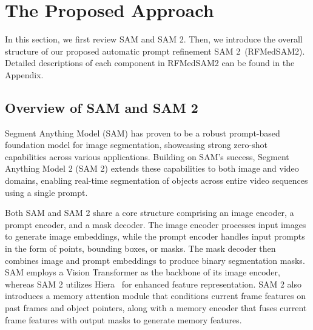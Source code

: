 \section{The Proposed Approach}
\label{sec:method}

In this section, we first review SAM and SAM 2. Then, we introduce the overall structure of our proposed automatic prompt refinement SAM 2~(RFMedSAM2). Detailed descriptions of each component in RFMedSAM2 can be found in the Appendix.






\subsection{Overview of SAM and SAM 2}
Segment Anything Model (SAM) has proven to be a robust prompt-based foundation model for image segmentation, showcasing strong zero-shot capabilities across various applications. Building on SAM's success, Segment Anything Model 2 (SAM 2) extends these capabilities to both image and video domains, enabling real-time segmentation of objects across entire video sequences using a single prompt.

Both SAM and SAM 2 share a core structure comprising an image encoder, a prompt encoder, and a mask decoder. The image encoder processes input images to generate image embeddings, while the prompt encoder handles input prompts in the form of points, bounding boxes, or masks. The mask decoder then combines image and prompt embeddings to produce binary segmentation masks. SAM employs a Vision Transformer as the backbone of its image encoder, whereas SAM 2 utilizes Hiera~\cite{ryali2023hiera} for enhanced feature representation. SAM 2 also introduces a memory attention module that conditions current frame features on past frames and object pointers, along with a memory encoder that fuses current frame features with output masks to generate memory features.


